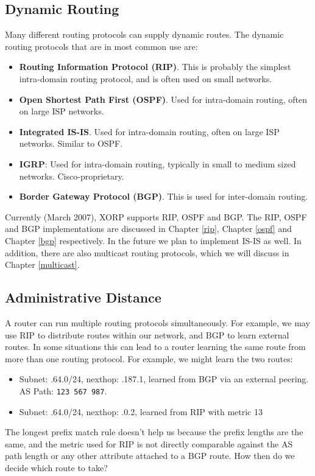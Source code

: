 \subsection{Dynamic Routing}

Many different routing protocols can supply dynamic routes.  The dynamic
routing protocols that are in most common use are:
\begin{itemize}
\item {\bf Routing Information Protocol (RIP)}.  This is probably the
simplest intra-domain routing protocol, and is often used on small
networks.
\item {\bf Open Shortest Path First (OSPF)}.  Used for intra-domain routing,
often on large ISP networks.
\item {\bf Integrated IS-IS}.  Used for intra-domain routing, often
on large ISP networks.  Similar to OSPF.
\item {\bf IGRP}: Used for intra-domain routing, typically in small to
medium sized networks.  Cisco-proprietary.
\item {\bf Border Gateway Protocol (BGP)}.  This is used for
inter-domain routing.
\end{itemize}
Currently (March 2007), XORP supports RIP, OSPF and BGP.
The RIP, OSPF and BGP implementations are discussed in Chapter \ref{rip},
Chapter \ref{ospf} and Chapter \ref{bgp} respectively.
In the future we plan to implement IS-IS as well.
In addition, there are also multicast routing protocols, which we will
discuss in Chapter \ref{multicast}.

\subsection{Administrative Distance}

A router can run multiple routing protocols simultaneously.  For
example, we may use RIP to distribute routes within our network, and
BGP to learn external routes.  In some situations this can lead to a
router learning the same route from more than one routing protocol.
For example, we might learn the two routes:
\begin{itemize}
\item Subnet: {.64.0/24}, nexthop: {.187.1},
learned from BGP via an external peering. AS Path: {\tt 123 567 987}.
\item Subnet: {.64.0/24}, nexthop: {.0.2}, learned
from RIP with metric 13
\end{itemize}
The longest prefix match rule doesn't help us because the prefix
lengths are the same, and the metric used for RIP is not directly
comparable against the AS path length or any other attribute attached
to a BGP route.  How then do we decide which route to take?

